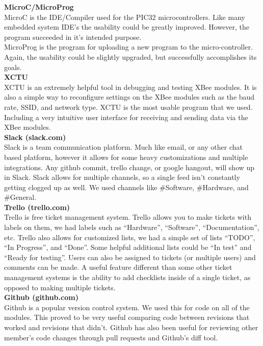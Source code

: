 \documentclass[paper=a4, fontsize=11pt]{scrartcl}
\numberwithin{equation}{section}		%
\numberwithin{figure}{section}			%
\numberwithin{table}{section}				%
\begin{document}
\textbf{MicroC/MicroProg}\\
MicroC is the IDE/Compiler used for the PIC32 microcontrollers. Like many embedded system IDE's the usability could be greatly improved. However, the program succeeded in it's intended purpose.\\
MicroProg is the program for uploading a new program to the micro-controller. Again, the usability could be slightly upgraded, but successfully accomplishes its goals.\\

\textbf{XCTU}\\
XCTU is an extremely helpful tool in debugging and testing XBee modules. It is also a simple way to reconfigure settings on the XBee modules such as the baud rate, SSID, and network type. XCTU is the most usable program that we used. Including a very intuitive user interface for receiving and sending data via the XBee modules.\\

\textbf{Slack (slack.com)}\\
Slack is a team communication platform. Much like email, or any other chat based platform, however it allows for some heavy customizations and multiple integrations. Any github commit, trello change, or google hangout, will show up in Slack. Slack allows for multiple channels, so a single feed isn't constantly getting clogged up as well. We used channels like \#Software, \#Hardware, and \#General.\\

\textbf{Trello (trello.com)}\\
Trello is free ticket management system. Trello allows you to make tickets with labels on them, we had labels such as “Hardware”, “Software”, “Documentation”, etc. Trello also allows for customized lists, we had a simple set of lists “TODO”, “In Progress”, and “Done”. Some helpful additional lists could be “In test” and “Ready for testing”.  Users can also be assigned to tickets (or multiple users) and comments can be made. A useful feature different than some other ticket management systems is the ability to add checklists inside of a single ticket, as opposed to making multiple tickets.\\

\textbf{Github (github.com)}\\
Github is a popular version control system. We used this for code on all of the modules. This proved to be very useful comparing code between revisions that worked and revisions that didn't. Github has also been useful for reviewing other member's code changes through pull requests and Github's diff tool.\\
\end{document}
